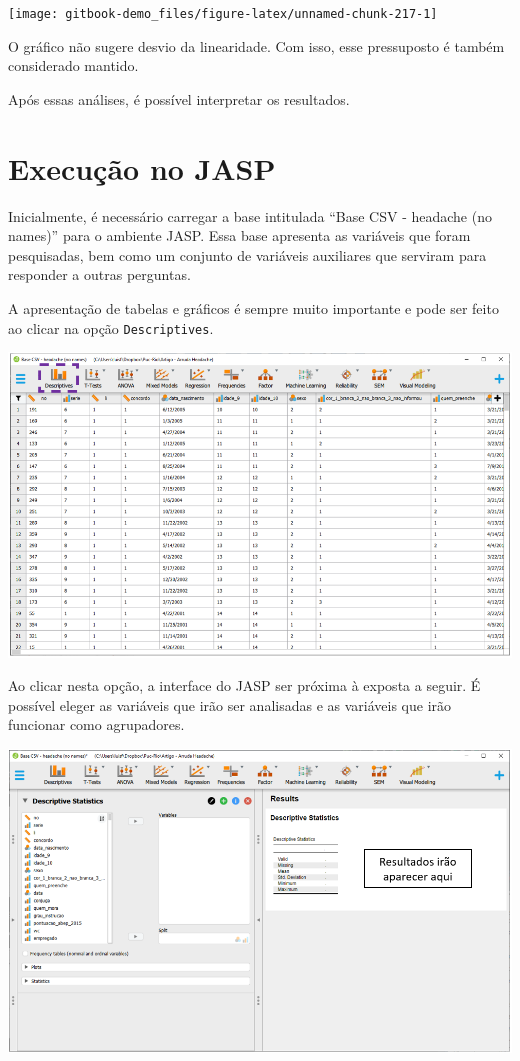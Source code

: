 \documentclass[
]{book}
\begin{document}
\begin{center}\texttt{[image: gitbook-demo\_files/figure-latex/unnamed-chunk-217-1]} \end{center}

O gráfico não sugere desvio da linearidade. Com isso, esse pressuposto é também considerado mantido.

Após essas análises, é possível interpretar os resultados.

\hypertarget{execuuxe7uxe3o-no-jasp-16}{%
\section{Execução no JASP}\label{execuuxe7uxe3o-no-jasp-16}}

Inicialmente, é necessário carregar a base intitulada ``Base CSV - headache (no names)'' para o ambiente JASP. Essa base apresenta as variáveis que foram pesquisadas, bem como um conjunto de variáveis auxiliares que serviram para responder a outras perguntas.

A apresentação de tabelas e gráficos é sempre muito importante e pode ser feito ao clicar na opção \texttt{Descriptives}.

\includegraphics{./img/cap_logistica_base.png}

Ao clicar nesta opção, a interface do JASP ser próxima à exposta a seguir. É possível eleger as variáveis que irão ser analisadas e as variáveis que irão funcionar como agrupadores.

\includegraphics{./img/cap_logistica_descriptives.png}
\end{document}
